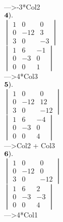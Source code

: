 \documentclass[]{article}
\begin{document}
---\textgreater{}-3*Col2\\

\(\bold{4).}\)\\

\(\begin{vmatrix} 1 & 0 & 0\\ 0 & -12 & 3 \\ 3 & 0 & -3 \end{vmatrix}\)\\

\(\begin{vmatrix} 1 & 6 & -1\\ 0 & -3 & 0 \\ 0 & 0 & 1 \end{vmatrix}\)\\

---\textgreater{}4*Col3\\

\(\bold{5).}\)\\

\(\begin{vmatrix} 1 & 0 & 0\\ 0 & -12 & 12 \\ 3 & 0 & -12 \end{vmatrix}\)\\

\(\begin{vmatrix} 1 & 6 & -4\\ 0 & -3 & 0 \\ 0 & 0 & 4 \end{vmatrix}\)\\

---\textgreater{}Col2 + Col3\\

\(\bold{6).}\)\\

\(\begin{vmatrix} 1 & 0 & 0\\ 0 & -12 & 0 \\ 3 & 0 & -12 \end{vmatrix}\)\\

\(\begin{vmatrix} 1 & 6 & 2\\ 0 & -3 & -3 \\ 0 & 0 & 4 \end{vmatrix}\)\\

---\textgreater{}4*Col1\\
\end{document}
